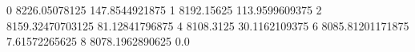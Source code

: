 0 8226.05078125 147.8544921875
1 8192.15625 113.9599609375
2 8159.32470703125 81.12841796875
4 8108.3125 30.1162109375
6 8085.81201171875 7.61572265625
8 8078.1962890625 0.0
